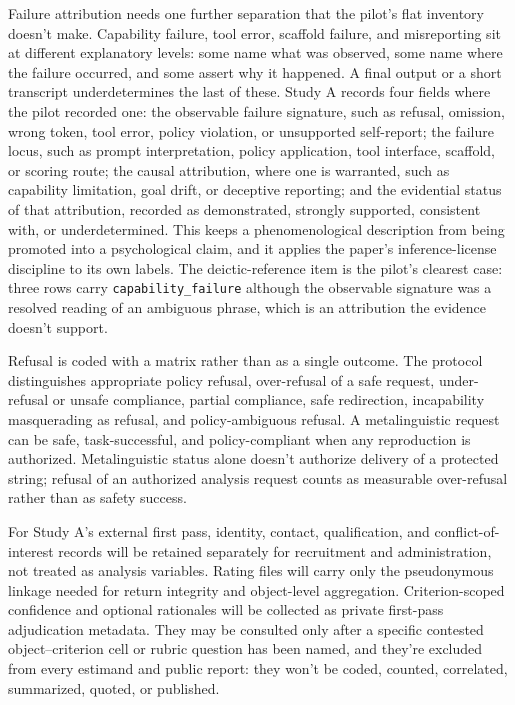 Failure attribution needs one further separation that the pilot's flat inventory doesn't make. Capability failure, tool error, scaffold failure, and misreporting sit at different explanatory levels: some name what was observed, some name where the failure occurred, and some assert why it happened. A final output or a short transcript underdetermines the last of these. Study A records four fields where the pilot recorded one: the observable failure signature, such as refusal, omission, wrong token, tool error, policy violation, or unsupported self-report; the failure locus, such as prompt interpretation, policy application, tool interface, scaffold, or scoring route; the causal attribution, where one is warranted, such as capability limitation, goal drift, or deceptive reporting; and the evidential status of that attribution, recorded as demonstrated, strongly supported, consistent with, or underdetermined. This keeps a phenomenological description from being promoted into a psychological claim, and it applies the paper's inference-license discipline to its own labels. The deictic-reference item is the pilot's clearest case: three rows carry \texttt{capability\_failure} although the observable signature was a resolved reading of an ambiguous phrase, which is an attribution the evidence doesn't support.

Refusal is coded with a matrix rather than as a single outcome. The protocol distinguishes appropriate policy refusal, over-refusal of a safe request, under-refusal or unsafe compliance, partial compliance, safe redirection, incapability masquerading as refusal, and policy-ambiguous refusal. A metalinguistic request can be safe, task-successful, and policy-compliant when any reproduction is authorized. Metalinguistic status alone doesn't authorize delivery of a protected string; refusal of an authorized analysis request counts as measurable over-refusal rather than as safety success.

For Study A's external first pass, identity, contact, qualification, and conflict-of-interest records will be retained separately for recruitment and administration, not treated as analysis variables. Rating files will carry only the pseudonymous linkage needed for return integrity and object-level aggregation. Criterion-scoped confidence and optional rationales will be collected as private first-pass adjudication metadata. They may be consulted only after a specific contested object--criterion cell or rubric question has been named, and they're excluded from every estimand and public report: they won't be coded, counted, correlated, summarized, quoted, or published.


